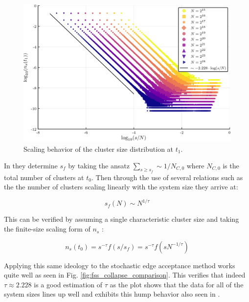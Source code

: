 \begin{figure}[H]
	\centering
	\includegraphics[width=350pt, clip]{images/n_s_t_1.png}
	\caption{Scaling behavior of the cluster size distribution at $t_1$.}
	\label{fig:n_s_t_1}
\end{figure}

In \cite{Lee_1} they determine $s_f$ by taking the ansatz $\sum_{s \ge s_f} \sim 1 / N_{C, 0}$ where $N_{C, 0}$ is the total number of clusters at $t_0$.
Then through the use of several relations such as the the number of clusters scaling linearly with the system size they arrive at:

\begin{equation}
	s_f(N) \sim N^{1 / \tau}
\end{equation}

This can be verified by assuming a single characteristic cluster size and taking the finite-size scaling form of $n_s$ \cite{Lee_1}:

\begin{equation}
	n_s(t_0) = s^{-\tau} f(s / s_f) = s^{-\tau} f(s N^{-1 / \tau})
\end{equation}

Applying this same ideology to the stochastic edge acceptance method works quite well as seen in Fig. \ref{fig:fss_collapse_comparison}.
This verifies that indeed $\tau \approx 2.228$ is a good estimation of $\tau$ as the plot shows that the data for all of the system sizes lines up well and exhibits this hump behavior also seen in \cite{Lee_1}.

